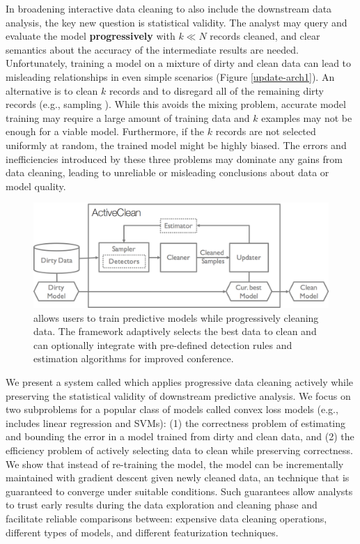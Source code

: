 In broadening interactive data cleaning to also include the downstream data analysis, the key new question is statistical validity.
The analyst may query and evaluate the model \textbf{progressively} with $k \ll N$ records cleaned, and clear semantics about the accuracy of the intermediate results are needed.
Unfortunately, training a model on a mixture of dirty and clean data can lead to misleading relationships in even simple scenarios (Figure \ref{update-arch1}).
An alternative is to clean $k$ records and to disregard all of the remaining dirty records (e.g., sampling \cite{wang1999sample}).
While this avoids the mixing problem, accurate model training may require a large amount of training data and $k$ examples may not be enough for a viable model.
Furthermore, if the $k$ records are not selected uniformly at random, the trained model might be highly biased.
The errors and inefficiencies introduced by these three problems may dominate any gains from data cleaning, leading to unreliable or misleading conclusions about data or model quality.

\begin{figure}[t]
\centering
 \includegraphics[width=\columnwidth]{figs/arch.png}
 \caption{\sysfull allows users to train predictive models while progressively cleaning data. The framework adaptively selects the best data to clean and can optionally integrate with pre-defined detection rules and estimation algorithms for improved conference. \label{sys-arch}}\vspace{-2em}
\end{figure}

We present a system called \sys which applies progressive data cleaning actively while preserving the statistical validity of downstream predictive analysis.
We focus on two subproblems for a popular class of models called convex loss models (e.g., includes linear regression and SVMs): (1) the correctness problem of estimating and bounding the error in a model trained from dirty and clean data, and (2) the efficiency problem of actively selecting data to clean while preserving correctness.
We show that instead of re-training the model, the model can be incrementally maintained with gradient descent given newly cleaned data, an technique that is guaranteed to converge under suitable conditions.
Such guarantees allow analysts to trust early results during the data exploration and cleaning phase and facilitate reliable comparisons between: expensive data cleaning operations, different types of models, and different featurization techniques.

